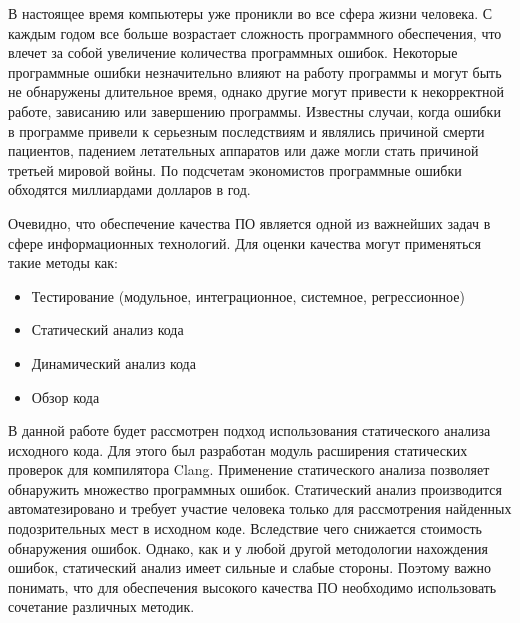 \intro
В настоящее время компьютеры уже проникли во все сфера жизни человека. С каждым годом все больше
возрастает сложность программного обеспечения, что влечет за собой увеличение количества программных 
ошибок. Некоторые программные ошибки незначительно влияют на работу программы и могут быть
не обнаружены длительное время, однако другие могут привести к некорректной работе, зависанию или
завершению программы. Известны случаи, когда ошибки в программе привели к серьезным последствиям и 
являлись причиной смерти пациентов, падением летательных аппаратов или даже могли стать причиной 
третьей мировой войны. По подсчетам экономистов программные ошибки обходятся миллиардами долларов в год. 

Очевидно, что обеспечение качества ПО является одной из важнейших задач в сфере информационных технологий.
Для оценки качества могут применяться такие методы как:
\begin{itemize}
	\item Тестирование (модульное, интеграционное, системное, регрессионное)
	\item Статический анализ кода
	\item Динамический анализ кода
	\item Обзор кода
\end{itemize}

В данной работе будет рассмотрен подход использования статического анализа исходного кода. 
Для этого был разработан модуль расширения статических проверок для компилятора Clang. Применение
статического анализа позволяет обнаружить множество программных ошибок. Статический анализ производится 
автоматезировано и требует участие человека только для рассмотрения найденных подозрительных
мест в исходном коде. Вследствие чего снижается стоимость обнаружения ошибок.  Однако, как и
у любой другой методологии нахождения ошибок, статический анализ имеет сильные и слабые стороны.
Поэтому важно понимать, что для обеспечения высокого качества ПО необходимо использовать сочетание
различных методик.